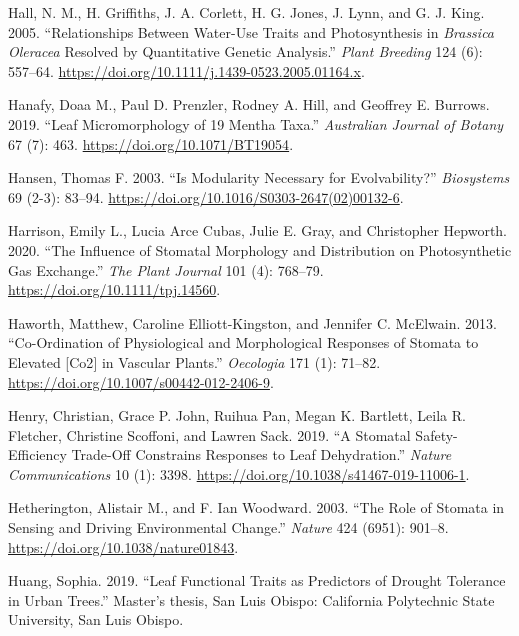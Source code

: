 \documentclass[
  12pt,
]{article}
\newlength{\cslhangindent}
\newlength{\cslentryspacingunit} %
\newenvironment{CSLReferences}[2] %
 {%
  \setlength{\parindent}{0pt}
  \ifodd #1
  \let\oldpar\par
  \def\par{\hangindent=\cslhangindent\oldpar}
  \fi
  \setlength{\parskip}{#2\cslentryspacingunit}
 }%
 {}
\begin{document}
\begin{CSLReferences}{1}{0}
\leavevmode{}%
Hall, N. M., H. Griffiths, J. A. Corlett, H. G. Jones, J. Lynn, and G. J. King. 2005. {``Relationships Between Water-Use Traits and Photosynthesis in \emph{{Brassica} Oleracea} Resolved by Quantitative Genetic Analysis.''} \emph{Plant Breeding} 124 (6): 557--64. \url{https://doi.org/10.1111/j.1439-0523.2005.01164.x}.

\leavevmode{}%
Hanafy, Doaa M., Paul D. Prenzler, Rodney A. Hill, and Geoffrey E. Burrows. 2019. {``Leaf Micromorphology of 19 {Mentha} Taxa.''} \emph{Australian Journal of Botany} 67 (7): 463. \url{https://doi.org/10.1071/BT19054}.

\leavevmode{}%
Hansen, Thomas F. 2003. {``Is Modularity Necessary for Evolvability?''} \emph{Biosystems} 69 (2-3): 83--94. \url{https://doi.org/10.1016/S0303-2647(02)00132-6}.

\leavevmode{}%
Harrison, Emily L., Lucia Arce Cubas, Julie E. Gray, and Christopher Hepworth. 2020. {``The Influence of Stomatal Morphology and Distribution on Photosynthetic Gas Exchange.''} \emph{The Plant Journal} 101 (4): 768--79. \url{https://doi.org/10.1111/tpj.14560}.

\leavevmode{}%
Haworth, Matthew, Caroline Elliott-Kingston, and Jennifer C. McElwain. 2013. {``Co-Ordination of Physiological and Morphological Responses of Stomata to Elevated {[}{Co2}{]} in Vascular Plants.''} \emph{Oecologia} 171 (1): 71--82. \url{https://doi.org/10.1007/s00442-012-2406-9}.

\leavevmode{}%
Henry, Christian, Grace P. John, Ruihua Pan, Megan K. Bartlett, Leila R. Fletcher, Christine Scoffoni, and Lawren Sack. 2019. {``A Stomatal Safety-Efficiency Trade-Off Constrains Responses to Leaf Dehydration.''} \emph{Nature Communications} 10 (1): 3398. \url{https://doi.org/10.1038/s41467-019-11006-1}.

\leavevmode{}%
Hetherington, Alistair M., and F. Ian Woodward. 2003. {``The Role of Stomata in Sensing and Driving Environmental Change.''} \emph{Nature} 424 (6951): 901--8. \url{https://doi.org/10.1038/nature01843}.

\leavevmode{}%
Huang, Sophia. 2019. {``Leaf Functional Traits as Predictors of Drought Tolerance in Urban Trees.''} Master's thesis, San Luis Obispo: California Polytechnic State University, San Luis Obispo.


\end{CSLReferences}
\end{document}
